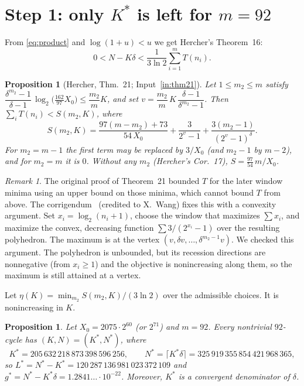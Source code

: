 \documentclass[11pt]{amsart}
\newtheorem{proposition}[theorem]{Proposition}
\theoremstyle{definition}
\theoremstyle{remark}
\newtheorem{remark}[theorem]{Remark}
\newcommand{\Kst}{K^{*}}
\newcommand{\Lst}{L^{*}}
\newcommand{\Nst}{N^{*}}
\begin{document}
\section{Step 1: only \texorpdfstring{$\Kst$}{K*} is left for \texorpdfstring{$m = 92$}{m = 92}}\label{sec:reduction}

From \eqref{eq:product} and $\log(1+u) < u$ we get Hercher's Theorem~16:
\begin{equation}\label{eq:thm16}
  0 < N - K\delta < \frac{1}{3\ln 2} \sum_{i=1}^{m} T(n_i).
\end{equation}

\begin{proposition}[Hercher, Thm.~21; Input~\ref{in:thm21}]\label{prop:thm21}
Let $1 \le m_2 \le m$ satisfy
$\dfrac{\delta^{m_2}-1}{\delta-1}\,\log_2\!\big(\tfrac{162}{97}X_0\big) \le \dfrac{m_2}{m}K$, and set
$v = \dfrac{m_2}{m}\,K\,\dfrac{\delta-1}{\delta^{m_2}-1}$. Then
$\sum_i T(n_i) < S(m_2, K)$, where
\[
  S(m_2,K) = \frac{97(m-m_2)+73}{54\,X_0} + \frac{3}{2^{v}-1} + \frac{3(m_2-1)}{(2^{v}-1)^{\delta}} .
\]
For $m_2 = m-1$ the first term may be replaced by $3/X_0$ (and $m_2 - 1$ by $m-2$), and for
$m_2 = m$ it is $0$. Without any $m_2$ (Hercher's Cor.~17), $S = \tfrac{97}{54}\, m / X_0$.
\end{proposition}

\begin{remark}
The original proof of Theorem~21 bounded $T$ for the later window minima using an upper bound on
those minima, which cannot bound $T$ from above. The corrigendum~\cite{hercher-corr} (credited to
X.~Wang) fixes this with a convexity argument. Set $x_i = \log_2(n_i+1)$, choose the window that
maximizes $\sum x_i$, and maximize the convex, decreasing function $\sum 3/(2^{x_i}-1)$ over the
resulting polyhedron. The maximum is at the vertex $(v, \delta v, \dots, \delta^{m_2-1} v)$.
We checked this argument. The polyhedron is unbounded, but its recession directions are nonnegative
(from $x_i \ge 1$) and the objective is nonincreasing along them, so the maximum is still attained
at a vertex.
\end{remark}

Let $\eta(K) = \min_{m_2} S(m_2, K)/(3\ln 2)$ over the admissible choices. It is nonincreasing in $K$.

\begin{proposition}\label{prop:reduction}
Let $X_0 = 2075\cdot 2^{60}$ (or $2^{71}$) and $m = 92$. Every nontrivial $92$-cycle has
$(K, N) = (\Kst, \Nst)$, where
\[
  \Kst = 205\,632\,218\,873\,398\,596\,256, \qquad
  \Nst = \lceil \Kst \delta \rceil = 325\,919\,355\,854\,421\,968\,365,
\]
so $\Lst = \Nst - \Kst = 120\,287\,136\,981\,023\,372\,109$ and
$g^{*} = \Nst - \Kst\delta = 1.2841\ldots \cdot 10^{-22}$. Moreover, $\Kst$ is a convergent
denominator of $\delta$.
\end{proposition}
\end{document}
